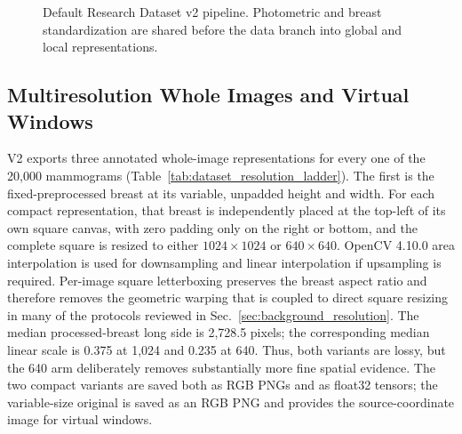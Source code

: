 \begin{figure}[t]
\centering
\setlength{\fboxsep}{5pt}
\caption{Default Research Dataset v2 pipeline.  Photometric and breast
standardization are shared before the data branch into global and local
representations.}
\label{fig:dataset_pipeline}
\end{figure}

\subsection{Multiresolution Whole Images and Virtual Windows}
\label{sec:dataset_representations}

V2 exports three annotated whole-image representations for every one of the
20,000 mammograms (Table~\ref{tab:dataset_resolution_ladder}).  The first is the
fixed-preprocessed breast at its variable, unpadded height and width.  For each
compact representation, that breast is independently placed at the top-left of
its own square canvas, with zero padding only on the right or bottom, and the
complete square is resized to either $1024\!\times\!1024$ or
$640\!\times\!640$.  OpenCV 4.10.0 area interpolation is used for downsampling
and linear interpolation if upsampling is required.  Per-image square
letterboxing preserves the breast aspect ratio and therefore removes the
geometric warping that is coupled to direct square resizing in many of the
protocols reviewed in Sec.~\ref{sec:background_resolution}.  The median
processed-breast long side is 2,728.5 pixels; the corresponding median linear
scale is 0.375 at 1,024 and 0.235 at 640.  Thus, both variants are lossy, but the
640 arm deliberately removes substantially more fine spatial evidence.  The two
compact variants are saved both as RGB PNGs and as float32 tensors; the
variable-size original is saved as an RGB PNG and provides the
source-coordinate image for virtual windows.

